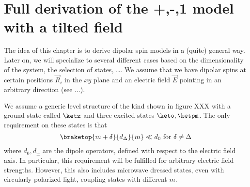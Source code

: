 \section{Full derivation of the +,-,1 model with a tilted field}

The idea of this chapter is to derive dipolar spin models in a (quite) general way. Later on, we will specialize to several different cases based on the dimensionality of the system, the selection of states, \ldots. We assume that we have dipolar spins at certain positions $\vec{R}_i$ in the $xy$ plane and an electric field $\vec{E}$ pointing in an arbitrary direction (see ...).

We assume a generic level structure of the kind shown in figure XXX with a ground state called $\ketz$ and three excited states $\keto, \ketpm$. The only requirement on these states is that
\begin{align}
    \braketop{m+\delta}{d_\Delta}{m} \ll d_0 \text{ for } \delta \ne \Delta
\end{align}
where $d_0, d_\pm$ are the dipole operators, defined with respect to the electric field axis.
In particular, this requirement will be fulfilled for arbitrary electric field strengths. However, this also includes microwave dressed states, even with circularly polarized light, coupling states with different $m$.

